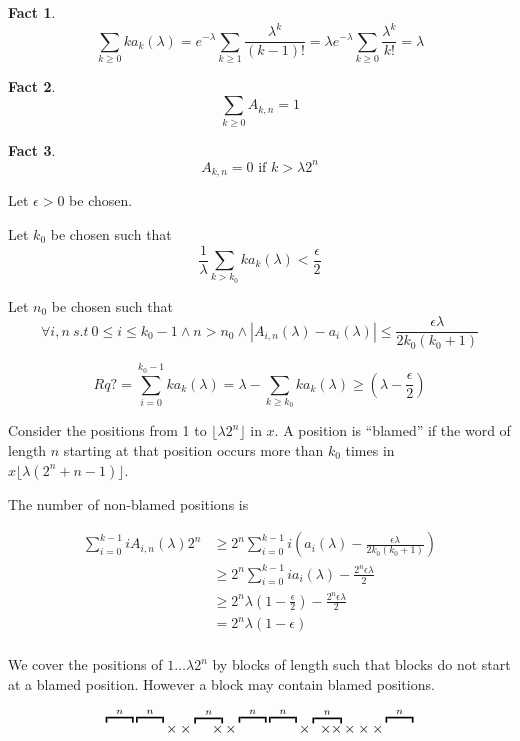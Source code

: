 \documentclass[11pt,a4paper]{tesis}
\newtheorem{fact}{Fact}[section]
\theoremstyle{definition}
\begin{document}
\begin{fact}
    $$\sum_{k \geq 0} ka_k(\lambda) = e^{-\lambda}\sum_{k \geq 1} \frac{\lambda^k}{(k-1)!} = \lambda e^{-\lambda} \sum_{k \geq 0} \frac{\lambda^k}{k!}= \lambda$$
\end{fact}





\begin{fact}
    $$\sum_{k \geq 0} A_{k,n} = 1$$
\end{fact}

\begin{fact}
    $$A_{k,n} = 0 \textrm{ if } k > \lambda2^n$$
\end{fact}

Let $\epsilon > 0$ be chosen.

Let $k_0$ be chosen such that 
$$\frac{1}{\lambda} \sum_{k > k_0} ka_k(\lambda) < \frac{\epsilon}{2}$$

Let $n_0$ be chosen such that 
$$\forall i,n \: s.t \:  0 \leq i \leq k_0 - 1 \wedge n > n_0 \wedge |A_{i,n}(\lambda) - a_i(\lambda)| \leq \frac{\epsilon\lambda}{2k_0(k_0+1)}$$

$$Rq? = \sum_{i=0}^{k_0-1} ka_k(\lambda) = \lambda - \sum_{k\geq k_0} ka_k(\lambda) \geq (\lambda - \frac{\epsilon}{2})$$

Consider the positions from 1 to $\lfloor\lambda2^n\rfloor$ in $x$. A position is ``blamed'' if the word of length $n$ starting at that position occurs more than $k_0$ times in $x\lfloor\lambda(2^n+n-1)\rfloor$.

The number of non-blamed positions is


\begin{align*}
    \sum_{i=0}^{k-1} iA_{i,n}(\lambda) 2^n &\geq 2^n\sum_{i=0}^{k-1} i (a_i(\lambda) - \frac{\epsilon\lambda}{2k_0(k_0+1)}) \\
    &\geq 2^n \sum_{i=0}^{k-1} ia_{i}(\lambda) - \frac{2^n\epsilon\lambda}{2} \\
    &\geq 2^n\lambda (1-\frac{\epsilon}{2}) - \frac{2^n\epsilon\lambda}{2} \\
    &= 2^n\lambda(1-\epsilon) \\
\end{align*}

We cover the positions of $1\dots \lambda2^n$ by blocks of length such that blocks do not start at a blamed  position. However a block may contain blamed positions.
 
$$\overbracket{\raisebox{6.4pt}{\qquad}}^{n} \overbracket{\raisebox{6.4pt}{\qquad}}^{n}\times\times\overbracket{\;\quad \times}^{n} \times \overbracket{\raisebox{6.4pt}{\qquad}}^{n} \overbracket{\raisebox{6.4pt}{\qquad}}^{n} \times \overbracket{\;\; \times \times}^{n} \times\times\times \overbracket{\raisebox{6.4pt}{\qquad}}^{n}$$
\end{document}
